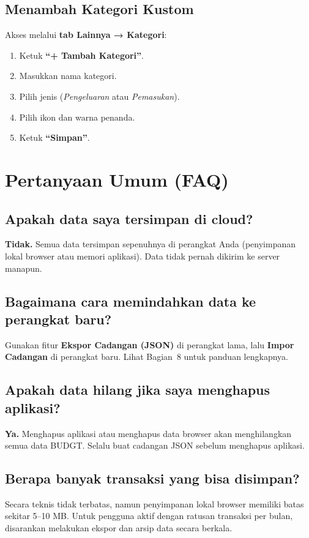 \documentclass[12pt, a4paper]{article}
\begin{document}
\subsection{Menambah Kategori Kustom}

Akses melalui \textbf{tab Lainnya → Kategori}:
\begin{enumerate}[leftmargin=1.5em]
  \item Ketuk \textbf{``+ Tambah Kategori''}.
  \item Masukkan nama kategori.
  \item Pilih jenis (\textit{Pengeluaran} atau \textit{Pemasukan}).
  \item Pilih ikon dan warna penanda.
  \item Ketuk \textbf{``Simpan''}.
\end{enumerate}

\section{Pertanyaan Umum (FAQ)}

\subsection*{Apakah data saya tersimpan di cloud?}
\textbf{Tidak.} Semua data tersimpan sepenuhnya di perangkat Anda (penyimpanan lokal browser atau memori aplikasi). Data tidak pernah dikirim ke server manapun.

\subsection*{Bagaimana cara memindahkan data ke perangkat baru?}
Gunakan fitur \textbf{Ekspor Cadangan (JSON)} di perangkat lama, lalu \textbf{Impor Cadangan} di perangkat baru. Lihat Bagian~8 untuk panduan lengkapnya.

\subsection*{Apakah data hilang jika saya menghapus aplikasi?}
\textbf{Ya.} Menghapus aplikasi atau menghapus data browser akan menghilangkan semua data BUDGT. Selalu buat cadangan JSON sebelum menghapus aplikasi.

\subsection*{Berapa banyak transaksi yang bisa disimpan?}
Secara teknis tidak terbatas, namun penyimpanan lokal browser memiliki batas sekitar 5--10 MB. Untuk pengguna aktif dengan ratusan transaksi per bulan, disarankan melakukan ekspor dan arsip data secara berkala.
\end{document}
